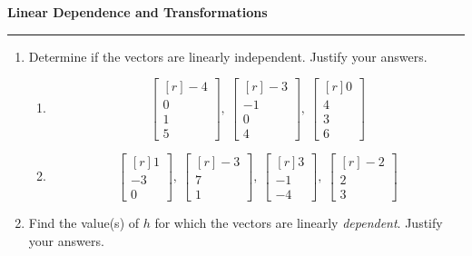 \documentclass[12pt]{article}
\begin{document}
\begin{center}
{\bf \Large Linear Dependence and Transformations}
\vspace{0.2cm}
\hrule
\end{center}


\begin{multicols*}{2}
	\begin{enumerate}
		\item Determine if the vectors are linearly independent. Justify your answers.
		\begin{enumerate}
			\item \[
				\begin{bmatrix*}[r]
					-4\\0\\1\\5
				\end{bmatrix*},\ \begin{bmatrix*}[r]
					-3\\-1\\0\\4	
				\end{bmatrix*},\ \begin{bmatrix*}[r]
					0\\4\\3\\6
				\end{bmatrix*}
			\]
			\vfill
			\item \[
				\begin{bmatrix*}[r]
					1\\-3\\0
				\end{bmatrix*},\ \begin{bmatrix*}[r]
					-3\\7\\1
				\end{bmatrix*},\ \begin{bmatrix*}[r]
					3\\-1\\-4
				\end{bmatrix*},\ \begin{bmatrix*}[r]
					-2\\2\\3
				\end{bmatrix*}
			\]
		\end{enumerate}
		\vfill
		\item Find the value(s) of $h$ for which the vectors are linearly \textit{dependent}. Justify your answers.

\end{enumerate}
\end{multicols*}
\end{document}
